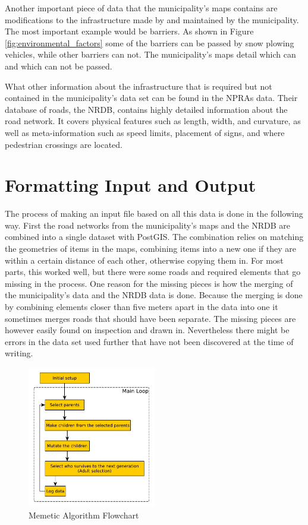 Another important piece of data that the municipality's maps contains are modifications to the infrastructure made by and maintained by the municipality. The most important example would be barriers. As shown in Figure \ref{fig:environmental_factors} some of the barriers can be passed by snow plowing vehicles, while other barriers can not. The municipality's maps detail which can and which can not be passed.

What other information about the infrastructure that is required but not contained in the municipality's data set can be found in the NPRAs data. Their database of roads, the NRDB, contains highly detailed information about the road network. It covers physical features such as length, width, and curvature, as well as meta-information such as speed limits, placement of signs, and where pedestrian crossings are located.

\section{Formatting Input and Output} %
\label{sec:achitecture_formatting_input_and_output}

The process of making an input file based on all this data is done in the following way. First the road networks from the municipality's maps and the NRDB are combined into a single dataset with PostGIS. The combination relies on matching the geometries of items in the maps, combining items into a new one if they are within a certain distance of each other, otherwise copying them in. For most parts, this worked well, but there were some roads and required elements that go missing in the process. One reason for the missing pieces is how the merging of the municipality's data and the NRDB data is done. Because the merging is done by combining elements closer than five meters apart in the data into one it sometimes merges roads that should have been separate. The missing pieces are however easily found on inspection and drawn in. Nevertheless there might be errors in the data set used further that have not been discovered at the time of writing.

\begin{figure}
    \begin{center}
        \includegraphics[width=0.5\textwidth]{figures/Architecture/MA_flowchart.pdf}
    \end{center}
    \caption{Memetic Algorithm Flowchart}
    \label{fig:ma_flowchart}
\end{figure}

